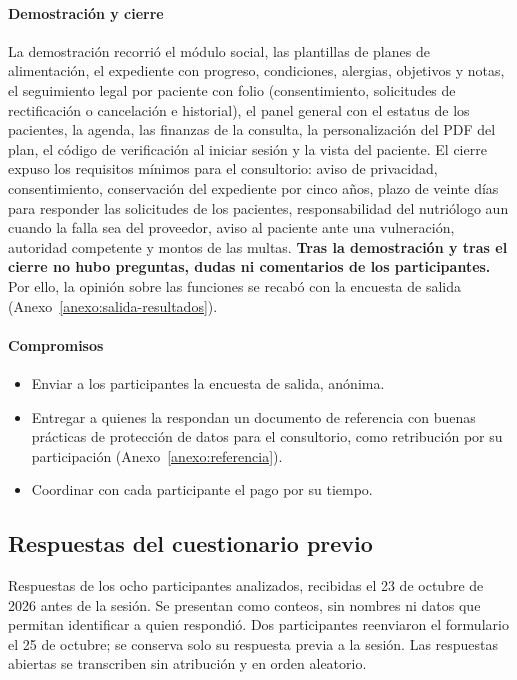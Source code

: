 \documentclass[12pt, a4paper]{article}
\begin{document}
\paragraph{Demostración y cierre}
La demostración recorrió el módulo social, las plantillas de planes de alimentación, el expediente con progreso, condiciones, alergias, objetivos y notas, el seguimiento legal por paciente con folio (consentimiento, solicitudes de rectificación o cancelación e historial), el panel general con el estatus de los pacientes, la agenda, las finanzas de la consulta, la personalización del PDF del plan, el código de verificación al iniciar sesión y la vista del paciente. El cierre expuso los requisitos mínimos para el consultorio: aviso de privacidad, consentimiento, conservación del expediente por cinco años, plazo de veinte días para responder las solicitudes de los pacientes, responsabilidad del nutriólogo aun cuando la falla sea del proveedor, aviso al paciente ante una vulneración, autoridad competente y montos de las multas. \textbf{Tras la demostración y tras el cierre no hubo preguntas, dudas ni comentarios de los participantes.} Por ello, la opinión sobre las funciones se recabó con la encuesta de salida (Anexo~\ref{anexo:salida-resultados}).

\paragraph{Compromisos}
\begin{itemize}[leftmargin=*,itemsep=1pt]
  \item Enviar a los participantes la encuesta de salida, anónima.
  \item Entregar a quienes la respondan un documento de referencia con buenas prácticas de protección de datos para el consultorio, como retribución por su participación (Anexo~\ref{anexo:referencia}).
  \item Coordinar con cada participante el pago por su tiempo.
\end{itemize}

\subsection{Respuestas del cuestionario previo}
\label{anexo:previo-resultados}

Respuestas de los ocho participantes analizados, recibidas el 23 de octubre de 2026 antes de la sesión. Se presentan como conteos, sin nombres ni datos que permitan identificar a quien respondió. Dos participantes reenviaron el formulario el 25 de octubre; se conserva solo su respuesta previa a la sesión. Las respuestas abiertas se transcriben sin atribución y en orden aleatorio.
\end{document}

